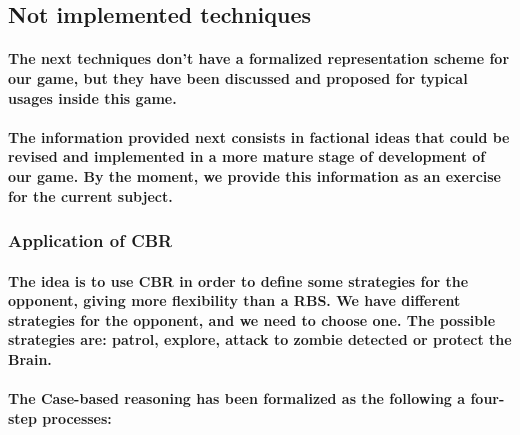 \documentclass[a4paper,10pt]{article}
\newcommand{\p}[1]{\paragraph{\indent\textnormal{#1}}}
\begin{document}
\subsection{Not implemented techniques}

    \p{The next techniques don't have a formalized representation scheme for our game, but they have been discussed and proposed for typical usages inside this game.}

    \p{The information provided next consists in factional ideas that could be revised and implemented in a more mature stage of development of our game. By the moment, we provide this information as an exercise for the current subject.}

  \subsubsection{Application of CBR}

    \p{The idea is to use CBR in order to define some strategies for the opponent, giving more flexibility than a RBS. We have different strategies for the opponent, and we need to choose one.
	The possible strategies are: \textbf{patrol}, \textbf{explore}, \textbf{attack to zombie detected} or \textbf{protect the Brain}.}

    \p{The Case-based reasoning has been formalized as the following a four-step processes:}
\end{document}
